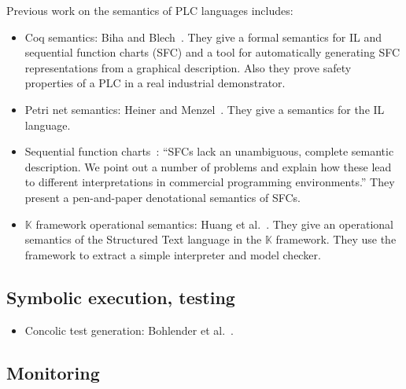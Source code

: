Previous work on the semantics of PLC languages includes:

\begin{itemize}

\item Coq semantics: Biha and Blech~\cite{biha:plc_sem1, biha:plc_sem2,
biha:plc_sem3}. They give a formal semantics for IL and sequential function
charts (SFC) and a tool for automatically generating SFC representations from a
graphical description. Also they prove safety properties of a PLC in a real
industrial demonstrator.


\item Petri net semantics: Heiner and Menzel~\cite{heiner:petri}. They give a
semantics for the IL language.

\item Sequential function charts~\cite{bauer:unifying}: ``SFCs lack an
unambiguous, complete semantic description. We point out a number of problems
and explain how these lead to different interpretations in commercial
programming environments.'' They present a pen-and-paper denotational semantics
of SFCs.


\item $\mathbb{K}$ framework operational semantics: Huang et
al.~\cite{huang:kst}. They give an operational semantics of the Structured Text
language in the $\mathbb{K}$ framework. They use the framework to extract a
simple interpreter and model checker.


\end{itemize}

\subsection{Symbolic execution, testing}

\begin{itemize}

\item Concolic test generation: Bohlender et al.~\cite{bohlender:concolic}.

\end{itemize}

\subsection{Monitoring}


